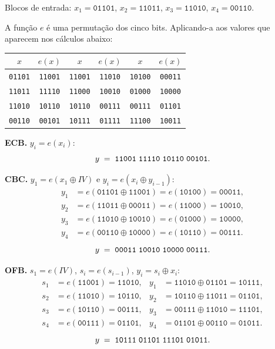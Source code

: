 \documentclass[12pt,a4paper]{article}
\newenvironment{resposta}{%
    \begin{respostabox}
    \color{red!70!black}\sloppy
}{%
    \end{respostabox}
}
\begin{document}
\begin{resposta}

Blocos de entrada:
$x_1 = \texttt{01101}$, $x_2 = \texttt{11011}$, $x_3 = \texttt{11010}$, $x_4 = \texttt{00110}$.

A função $e$ é uma permutação dos cinco bits. Aplicando-a aos valores que aparecem nos cálculos abaixo:

\begin{center}
\small
\begin{tabular}{|c|c||c|c||c|c|}
\hline
$x$ & $e(x)$ & $x$ & $e(x)$ & $x$ & $e(x)$ \\
\hline
\texttt{01101} & \texttt{11001} & \texttt{11001} & \texttt{11010} & \texttt{10100} & \texttt{00011} \\
\texttt{11011} & \texttt{11110} & \texttt{11000} & \texttt{10010} & \texttt{01000} & \texttt{10000} \\
\texttt{11010} & \texttt{10110} & \texttt{10110} & \texttt{00111} & \texttt{00111} & \texttt{01101} \\
\texttt{00110} & \texttt{00101} & \texttt{10111} & \texttt{01111} & \texttt{11100} & \texttt{10011} \\
\hline
\end{tabular}
\end{center}

\textbf{ECB.} $y_i = e(x_i)$:
\[
y \;=\; \texttt{11001\;11110\;10110\;00101}.
\]

\textbf{CBC.} $y_1 = e(x_1 \oplus IV)$ e $y_i = e(x_i \oplus y_{i-1})$:
\begin{align*}
y_1 &= e(\texttt{01101}\oplus\texttt{11001}) = e(\texttt{10100}) = \texttt{00011},\\
y_2 &= e(\texttt{11011}\oplus\texttt{00011}) = e(\texttt{11000}) = \texttt{10010},\\
y_3 &= e(\texttt{11010}\oplus\texttt{10010}) = e(\texttt{01000}) = \texttt{10000},\\
y_4 &= e(\texttt{00110}\oplus\texttt{10000}) = e(\texttt{10110}) = \texttt{00111}.
\end{align*}
\[
y \;=\; \texttt{00011\;10010\;10000\;00111}.
\]

\textbf{OFB.} $s_1 = e(IV)$, $s_i = e(s_{i-1})$, $y_i = s_i \oplus x_i$:
\begin{align*}
s_1 &= e(\texttt{11001}) = \texttt{11010}, & y_1 &= \texttt{11010}\oplus\texttt{01101} = \texttt{10111},\\
s_2 &= e(\texttt{11010}) = \texttt{10110}, & y_2 &= \texttt{10110}\oplus\texttt{11011} = \texttt{01101},\\
s_3 &= e(\texttt{10110}) = \texttt{00111}, & y_3 &= \texttt{00111}\oplus\texttt{11010} = \texttt{11101},\\
s_4 &= e(\texttt{00111}) = \texttt{01101}, & y_4 &= \texttt{01101}\oplus\texttt{00110} = \texttt{01011}.
\end{align*}
\[
y \;=\; \texttt{10111\;01101\;11101\;01011}.
\]


\end{resposta}
\end{document}
